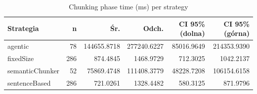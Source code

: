 \begin{table}[H]
    \centering
    \caption{Chunking phase time (ms) per strategy}
    \small
    \begin{tabular}{@{}lrrrrr@{}}
        \toprule
        \textbf{Strategia} & \textbf{n} & \textbf{Śr.} & \textbf{Odch.} & \textbf{CI 95\% (dolna)} & \textbf{CI 95\% (górna)} \\
        \midrule
        agentic & 78 & 144655.8718 & 277240.6227 & 85016.9649 & 214353.9390 \\
        fixedSize & 286 & 874.4845 & 1468.9729 & 712.3025 & 1042.2137 \\
        semanticChunker & 52 & 75869.4748 & 111408.3779 & 48228.7208 & 106154.6158 \\
        sentenceBased & 286 & 721.0261 & 1328.4482 & 580.3125 & 871.9796 \\
        \bottomrule
    \end{tabular}
\end{table}
